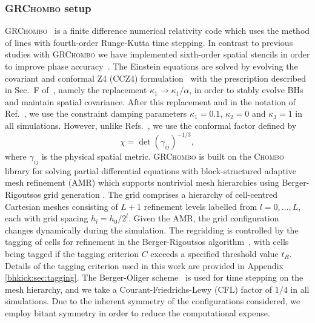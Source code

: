 \subsubsection{\textsc{GRChombo} setup}
\label{bhkick:sec:grchombo}
\textsc{GRChombo}~\cite{Clough:2015sqa} is a finite difference
numerical relativity code which uses the method of lines with
fourth-order Runge-Kutta time stepping. In contrast to previous studies
with \textsc{GRChombo} we have implemented sixth-order spatial
stencils in order to improve phase accuracy~\cite{Husa:2007hp}. The
Einstein equations are solved by evolving the covariant and conformal
Z4 (CCZ4) formulation~\cite{Alic:2011gg} with the prescription
described in Sec.~F of~\cite{Alic:2013xsa}, namely the replacement
$\kappa_1 \to \kappa_1/\alpha$, in order to stably evolve BHs
and maintain spatial covariance. After this replacement and in the
notation of Ref.~\cite{Alic:2011gg}, we use the constraint damping
parameters $\kappa_1=0.1$, $\kappa_2=0$ and $\kappa_3=1$ in all
simulations.  However, unlike Refs.~\cite{Clough:2015sqa,Alic:2011gg},
we use the conformal factor defined by
\begin{equation}
    \chi = \det(\gamma_{ij})^{-1/3},\label{bhkick:eq:con-fac}
\end{equation}
where $\gamma_{ij}$ is the physical spatial metric.
\textsc{GRChombo} is built on the \textsc{Chombo}~\cite{ChomboReport}
library for solving partial differential equations with
block-structured adaptive mesh refinement (AMR) which supports
nontrivial mesh hierarchies using Berger-Rigoutsos grid generation
\cite{Berger1991}. The grid comprises a hierarchy of cell-centred
Cartesian meshes consisting of $L+1$ refinement levels labelled from
$l=0,\ldots,L$, each with grid spacing $h_l=h_0/2^l$. Given the
AMR, the grid configuration changes dynamically during the simulation.
The regridding is controlled by the tagging of cells for refinement
in the Berger-Rigoutsos algorithm~\cite{Berger1991}, with cells being
tagged if the tagging criterion $C$ exceeds a specified threshold
value $t_R$. Details of the tagging criterion used in this work are
provided in Appendix \ref{bhkick:sec:tagging}. The Berger-Oliger scheme~\cite{Berger1991}
is used for time stepping on the mesh hierarchy, and we take a
Courant-Friedrichs-Lewy (CFL) factor of $1/4$ in all simulations.
Due to the inherent symmetry of the configurations considered, we
employ bitant symmetry in order to reduce the computational expense.

